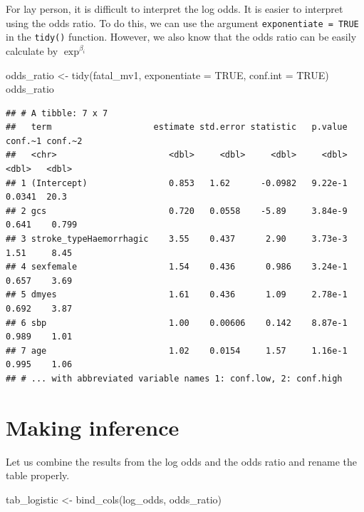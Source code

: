 \documentclass[
  10pt,
]{krantz}
\newenvironment{Shaded}{\begin{snugshade}}{\end{snugshade}}
\newcommand{\AttributeTok}[1]{\textcolor[rgb]{0.77,0.63,0.00}{#1}}
\newcommand{\ConstantTok}[1]{\textcolor[rgb]{0.00,0.00,0.00}{#1}}
\newcommand{\FunctionTok}[1]{\textcolor[rgb]{0.00,0.00,0.00}{#1}}
\newcommand{\NormalTok}[1]{#1}
\newcommand{\OtherTok}[1]{\textcolor[rgb]{0.56,0.35,0.01}{#1}}
\begin{document}
For lay person, it is difficult to interpret the log odds. It is easier to interpret using the odds ratio. To do this, we can use the argument \texttt{exponentiate\ =\ TRUE} in the \texttt{tidy()} function. However, we also know that the odds ratio can be easily calculate by \(\exp^{\beta_i}\)

\begin{Shaded}
\begin{Highlighting}[]
\NormalTok{odds\_ratio }\OtherTok{\textless{}{-}} \FunctionTok{tidy}\NormalTok{(fatal\_mv1,}
                   \AttributeTok{exponentiate =} \ConstantTok{TRUE}\NormalTok{,  }
                   \AttributeTok{conf.int =} \ConstantTok{TRUE}\NormalTok{)}
\NormalTok{odds\_ratio}
\end{Highlighting}
\end{Shaded}

\begin{verbatim}
## # A tibble: 7 x 7
##   term                    estimate std.error statistic   p.value conf.~1 conf.~2
##   <chr>                      <dbl>     <dbl>     <dbl>     <dbl>   <dbl>   <dbl>
## 1 (Intercept)                0.853   1.62      -0.0982   9.22e-1  0.0341  20.3  
## 2 gcs                        0.720   0.0558    -5.89     3.84e-9  0.641    0.799
## 3 stroke_typeHaemorrhagic    3.55    0.437      2.90     3.73e-3  1.51     8.45 
## 4 sexfemale                  1.54    0.436      0.986    3.24e-1  0.657    3.69 
## 5 dmyes                      1.61    0.436      1.09     2.78e-1  0.692    3.87 
## 6 sbp                        1.00    0.00606    0.142    8.87e-1  0.989    1.01 
## 7 age                        1.02    0.0154     1.57     1.16e-1  0.995    1.06 
## # ... with abbreviated variable names 1: conf.low, 2: conf.high
\end{verbatim}

\hypertarget{making-inference}{%
\section{Making inference}\label{making-inference}}

Let us combine the results from the log odds and the odds ratio and rename the table properly.

\begin{Shaded}
\begin{Highlighting}[]
\NormalTok{tab\_logistic }\OtherTok{\textless{}{-}} \FunctionTok{bind\_cols}\NormalTok{(log\_odds, odds\_ratio) }
\end{Highlighting}
\end{Shaded}
\end{document}
